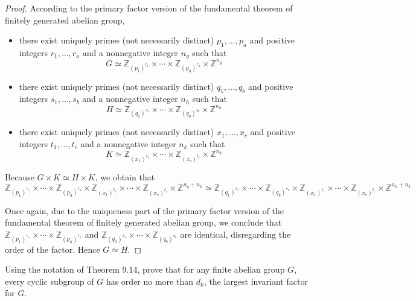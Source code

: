 \begin{proof}
    According to the primary factor version of the fundamental theorem of finitely generated abelian group,
    \begin{itemize}
        \item there exist uniquely primes (not necessarily distinct) $p_{1}, \ldots, p_{a}$ and positive integers $r_{1}, \ldots, r_{a}$ and a nonnegative integer $n_{g}$ such that
              \[
                  G \simeq \mathbb{Z}_{{(p_{1})}^{r_{1}}} \times \cdots \times \mathbb{Z}_{{(p_{a})}^{r_{a}}} \times \mathbb{Z}^{n_{g}}
              \]
        \item there exist uniquely primes (not necessarily distinct) $q_{1}, \ldots, q_{b}$ and positive integers $s_{1}, \ldots, s_{b}$ and a nonnegative integer $n_{h}$ such that
              \[
                  H \simeq \mathbb{Z}_{{(q_{1})}^{s_{1}}} \times \cdots \times \mathbb{Z}_{{(q_{b})}^{s_{b}}} \times \mathbb{Z}^{n_{h}}
              \]
        \item there exist uniquely primes (not necessarily distinct) $x_{1}, \ldots, x_{c}$ and positive integers $t_{1}, \ldots, t_{c}$ and a nonnegative integer $n_{k}$ such that
              \[
                  K \simeq \mathbb{Z}_{{(x_{1})}^{t_{1}}} \times \cdots \times \mathbb{Z}_{{(x_{c})}^{t_{c}}} \times \mathbb{Z}^{n_{k}}
              \]
    \end{itemize}

    Because $G\times K \simeq H\times K$, we obtain that
    \[
        \mathbb{Z}_{{(p_{1})}^{r_{1}}} \times \cdots \times \mathbb{Z}_{{(p_{a})}^{r_{a}}} \times \mathbb{Z}_{{(x_{1})}^{t_{1}}} \times \cdots \times \mathbb{Z}_{{(x_{c})}^{t_{c}}} \times \mathbb{Z}^{n_{g} + n_{k}}
        \simeq
        \mathbb{Z}_{{(q_{1})}^{s_{1}}} \times \cdots \times \mathbb{Z}_{{(q_{b})}^{s_{b}}} \times \mathbb{Z}_{{(x_{1})}^{t_{1}}} \times \cdots \times \mathbb{Z}_{{(x_{c})}^{t_{c}}} \times \mathbb{Z}^{n_{h} + n_{k}}
    \]

    Once again, due to the uniqueness part of the primary factor version of the fundamental theorem of finitely generated abelian group, we conclude that $\mathbb{Z}_{{(p_{1})}^{r_{1}}} \times \cdots \times \mathbb{Z}_{{(p_{a})}^{r_{a}}}$ and $\mathbb{Z}_{{(q_{1})}^{s_{1}}} \times \cdots \times \mathbb{Z}_{{(q_{b})}^{s_{b}}}$ are identical, disregarding the order of the factor. Hence $G\simeq H$.
\end{proof}

\begin{exercise}
    Using the notation of Theorem 9.14, prove that for any finite abelian group $G$, every cyclic subgroup of $G$ has order no more than $d_{k}$, the largest invariant factor for $G$.
\end{exercise}

